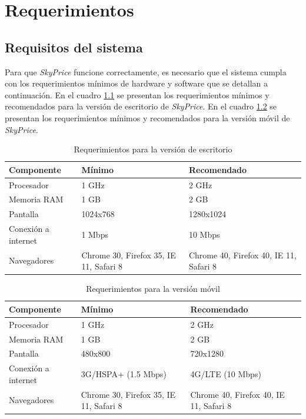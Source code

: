 %
%

\chapter{\textcolor{azulescom}{Requerimientos}}

\section{Requisitos del sistema}

Para que \textit{SkyPrice} funcione correctamente, es necesario que el sistema
cumpla con los requerimientos mínimos de hardware y software que se detallan a
continuación. En el cuadro \ref{tab:requerimientos-desktop} se presentan los
requerimientos mínimos y recomendados para la versión de escritorio de \textit{SkyPrice}.
En el cuadro \ref{tab:requerimientos-movil} se presentan los requerimientos mínimos
y recomendados para la versión móvil de \textit{SkyPrice}.

\begin{table}[H]
\centering
\begin{tabular}{|p{4cm}|p{4cm}|p{4cm}|}
\hline
\textbf{Componente} & \textbf{Mínimo} & \textbf{Recomendado} \\ \hline
Procesador & 1 GHz & 2 GHz \\ \hline
Memoria RAM & 1 GB & 2 GB \\ \hline
Pantalla & 1024x768 & 1280x1024 \\ \hline
Conexión a internet & 1 Mbps & 10 Mbps \\ \hline
Navegadores & Chrome 30, Firefox 35, IE 11, Safari 8 & Chrome 40, Firefox 40, IE 11, Safari 8 \\ \hline
\end{tabular}
\caption{Requerimientos para la versión de escritorio}
\label{tab:requerimientos-desktop}
\end{table}

\begin{table}[H]
\centering
\begin{tabular}{|p{4cm}|p{4cm}|p{4cm}|}
\hline
\textbf{Componente} & \textbf{Mínimo} & \textbf{Recomendado} \\ \hline
Procesador & 1 GHz & 2 GHz \\ \hline
Memoria RAM & 1 GB & 2 GB \\ \hline
Pantalla & 480x800 & 720x1280 \\ \hline
Conexión a internet & 3G/HSPA+ (1.5 Mbps) & 4G/LTE (10 Mbps) \\ \hline
Navegadores & Chrome 30, Firefox 35, IE 11, Safari 8 & Chrome 40, Firefox 40, IE 11, Safari 8 \\ \hline
\end{tabular}
\caption{Requerimientos para la versión móvil}
\label{tab:requerimientos-movil}
\end{table}

